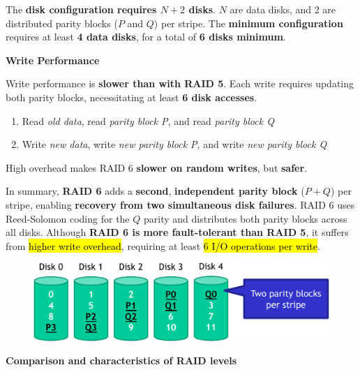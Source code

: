 \highspace
The \textbf{disk configuration requires $N+2$ disks}. $N$ are data disks, and $2$ are distributed parity blocks ($P$ and $Q$) per stripe. The \textbf{minimum configuration} requires at least \textbf{4 data disks}, for a total of \textbf{6 disks minimum}.

\highspace
\begin{flushleft}
    \textcolor{Red2}{ \textbf{Write Performance}}
\end{flushleft}
Write performance is \textbf{slower than with RAID 5}. Each write requires updating both parity blocks, necessitating at least \textbf{6 disk accesses}.
\begin{enumerate}
    \item Read \emph{old data}, read \emph{parity block P}, and read \emph{parity block Q}
    \item Write \emph{new data}, write \emph{new parity block P}, and write \emph{new parity block Q}
\end{enumerate}
High overhead makes RAID 6 \textcolor{Red2}{\textbf{slower on random writes}}, but \textcolor{Green3}{\textbf{safer}}.

\highspace
In summary, \textbf{RAID 6} adds a \textbf{second}, \textbf{independent parity block} ($P + Q$) per stripe, enabling \textbf{recovery from two simultaneous disk failures}. RAID 6 uses Reed-Solomon coding for the $Q$ parity and distributes both parity blocks across all disks. Although \textbf{RAID 6 is more fault-tolerant than RAID 5}, it suffers from \hl{higher write overhead}, requiring at least \hl{6 I/O operations per write}.

\newpage

\begin{figure}[!htp]
    \centering
    \includegraphics[width=\textwidth]{img/raid-010.pdf}
\end{figure}

\longline

\begin{center}\label{Comparison and characteristics of RAID levels}
    \large
    \hypertarget{Comparison and characteristics of RAID levels}{\textcolor{Red2}{\textbf{Comparison and characteristics of RAID levels}}}
\end{center}

